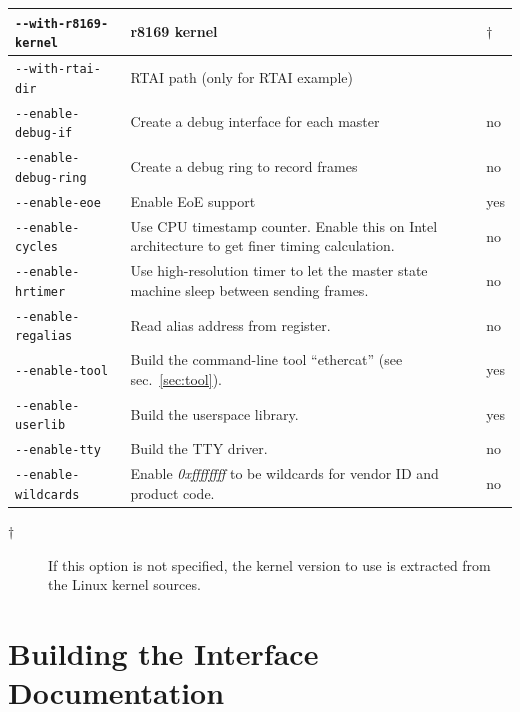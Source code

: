 \documentclass[a4paper,12pt,BCOR6mm,bibtotoc,idxtotoc]{scrbook}
\begin{document}
\begin{longtable}{l|p{}|l}
\lstinline+--with-r8169-kernel+ & r8169 kernel & $\dagger$\\

\hline

\lstinline+--with-rtai-dir+ & RTAI path (only for RTAI example) & \\

\lstinline+--enable-debug-if+ & Create a debug interface for each master & no\\

\lstinline+--enable-debug-ring+ & Create a debug ring to record frames & no\\

\lstinline+--enable-eoe+ & Enable EoE support & yes\\

\lstinline+--enable-cycles+ & Use CPU timestamp counter. Enable this on Intel
architecture to get finer timing calculation. & no\\

\lstinline+--enable-hrtimer+ & Use high-resolution timer to let the master
state machine sleep between sending frames. & no\\

\lstinline+--enable-regalias+ & Read alias address from register. & no\\

\lstinline+--enable-tool+ & Build the command-line tool ``ethercat'' (see
sec.~\ref{sec:tool}). & yes\\

\lstinline+--enable-userlib+ & Build the userspace library. & yes\\

\lstinline+--enable-tty+ & Build the TTY driver. & no\\

\lstinline+--enable-wildcards+ & Enable \textit{0xffffffff} to be wildcards
for vendor ID and product code. & no\\

\hline

\end{longtable}

\begin{description}

\item[$\dagger$] If this option is not specified, the kernel version to use is
extracted from the Linux kernel sources.

\end{description}

\section{Building the Interface Documentation}
\label{sec:gendoc}
\end{document}
